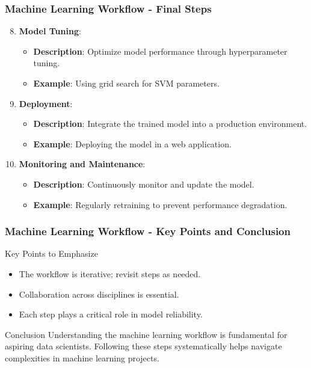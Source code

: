 \documentclass[aspectratio=169]{beamer}
\begin{document}
\begin{frame}[fragile]
    \frametitle{Machine Learning Workflow - Final Steps}
    \begin{enumerate}
        \setcounter{enumi}{7}

        \item \textbf{Model Tuning}:
        \begin{itemize}
            \item \textbf{Description}: Optimize model performance through hyperparameter tuning.
            \item \textbf{Example}: Using grid search for SVM parameters.
        \end{itemize}
        
        \item \textbf{Deployment}:
        \begin{itemize}
            \item \textbf{Description}: Integrate the trained model into a production environment.
            \item \textbf{Example}: Deploying the model in a web application.
        \end{itemize}

        \item \textbf{Monitoring and Maintenance}:
        \begin{itemize}
            \item \textbf{Description}: Continuously monitor and update the model.
            \item \textbf{Example}: Regularly retraining to prevent performance degradation.
        \end{itemize}
    \end{enumerate}
\end{frame}

\begin{frame}[fragile]
    \frametitle{Machine Learning Workflow - Key Points and Conclusion}
    \begin{block}{Key Points to Emphasize}
        \begin{itemize}
            \item The workflow is iterative; revisit steps as needed.
            \item Collaboration across disciplines is essential.
            \item Each step plays a critical role in model reliability.
        \end{itemize}
    \end{block}

    \begin{block}{Conclusion}
        Understanding the machine learning workflow is fundamental for aspiring data scientists. Following these steps systematically helps navigate complexities in machine learning projects.
    \end{block}
\end{frame}
\end{document}
